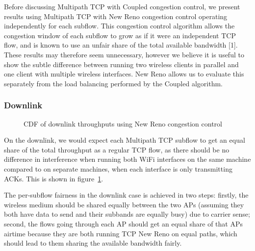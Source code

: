 Before discussing Multipath TCP with Coupled congestion control, we present
results using Multipath TCP with New Reno congestion control operating
independently for each subflow. This congestion control algorithm allows the
congestion window of each subflow to grow as if it were an independent TCP flow,
and is known to use an unfair share of the total available bandwidth [1]. These
results may therefore seem unnecessary, however we believe it is useful to show
the subtle difference between running two wireless clients in parallel and one
client with multiple wireless interfaces. New Reno allows us to evaluate this
separately from the load balancing performed by the Coupled algorithm.


\subsubsection{Downlink}
\label{sec:results-mptcp-down}

\begin{figure}[h]
 \centering
 \subfloat[][2.4 GHz, disparate channel] {\
 }
 \subfloat[][5 and 2.4 GHz] {\
 }

 \caption{CDF of downlink throughputs using New Reno congestion control}\label{graph:reno-down}
\end{figure}

On the downlink, we would expect each Multipath TCP subflow to get an equal
share of the total throughput as a regular TCP flow, as there should be no
difference in interference when running both WiFi interfaces on the same machine
compared to on separate machines, when each interface is only transmitting ACKs.
This is shown in figure~\ref{graph:reno-down}.

The per-subflow fairness in the downlink case is achieved in two steps: firstly,
the wireless medium should be shared equally between the two APs (assuming they
both have data to send and their subbands are equally busy) due to carrier
sense; second, the flows going through each AP should get an equal share of that
APs airtime because they are both running TCP New Reno on equal paths, which
should lead to them sharing the available bandwidth fairly.

